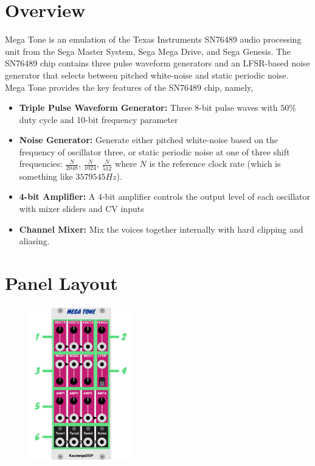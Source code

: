 \documentclass[12pt,letter]{article}
\begin{document}


\section*{Overview}

Mega Tone is an emulation of the Texas Instruments SN76489 audio processing unit from the Sega Master System, Sega Mega Drive, and Sega Genesis. The SN76489 chip contains three pulse waveform generators and an LFSR-based noise generator that selects between pitched white-noise and static periodic noise. Mega Tone provides the key features of the SN76489 chip, namely,
\begin{itemize}
  \item \textbf{Triple Pulse Waveform Generator:} Three 8-bit pulse waves with $50\%$ duty cycle and 10-bit frequency parameter
  \item \textbf{Noise Generator:} Generate either pitched white-noise based on the frequency of oscillator three, or static periodic noise at one of three shift frequencies: $\frac{N}{2048}$, $\frac{N}{1024}$, $\frac{N}{512}$ where $N$ is the reference clock rate (which is something like $3579545Hz$).
  \item \textbf{4-bit Amplifier:} A 4-bit amplifier controls the output level of each oscillator with mixer sliders and CV inputs
  \item \textbf{Channel Mixer:} Mix the voices together internally with hard clipping and aliasing.
\end{itemize}


\clearpage
\section*{Panel Layout}

\begin{figure}[!htp]
\centering
\includegraphics[width=0.4\textwidth]{MegaTone-Manual}
\end{figure}
\end{document}
